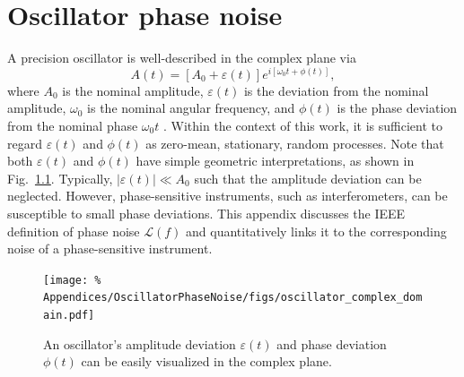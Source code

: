 \chapter{Oscillator phase noise}
\label{app:OscillatorPhaseNoise}
A precision oscillator is well-described in the complex plane via
\begin{equation}
  A(t)
  =
  \left[ A_0 + \varepsilon(t) \right]
  e^{i \left[ \omega_0 t + \phi(t) \right]},
\end{equation}
where
$A_0$ is the nominal amplitude,
$\varepsilon(t)$ is the deviation from the nominal amplitude,
$\omega_0$ is the nominal angular frequency, and
$\phi(t)$ is the phase deviation from the nominal phase $\omega_0 t$
\cite{ieee_std1139}.
Within the context of this work,
it is sufficient to regard $\varepsilon(t)$ and $\phi(t)$
as zero-mean, stationary, random processes.
Note that both $\varepsilon(t)$ and $\phi(t)$
have simple geometric interpretations,
as shown in Fig.~\ref{fig:OscillatorPhaseNoise:oscillator_complex_plane}.
Typically, $|\varepsilon(t)| \ll A_0$ such that
the amplitude deviation can be neglected.
However, phase-sensitive instruments,
such as interferometers,
can be susceptible to small phase deviations.
This appendix discusses
the IEEE definition of phase noise $\mathcal{L}(f)$ and
quantitatively links it
to the corresponding noise of a phase-sensitive instrument.

\begin{figure}[h]
  \centering
  \texttt{[image: \%
    Appendices/OscillatorPhaseNoise/figs/oscillator\_complex\_domain.pdf]}
  \caption[Oscillator amplitude and phase deviations in the complex plane]{%
    An oscillator's amplitude deviation $\varepsilon(t)$ and
    phase deviation $\phi(t)$ can be easily visualized in the complex plane.}
\label{fig:OscillatorPhaseNoise:oscillator_complex_plane}
\end{figure}


